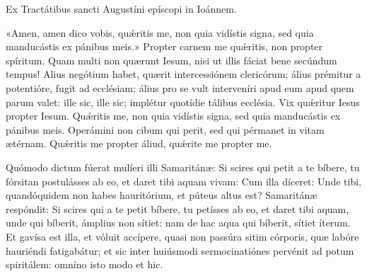 {

\noindent Ex Tractátibus sancti Augustíni epíscopi in Ioánnem.

\noindent «Amen, amen dico vobis, quǽritis me, non quia vidístis signa, sed quia manducástis ex pánibus meis.» Propter carnem me quǽritis, non propter spíritum. Quam multi non quærunt Iesum, nisi ut illis fáciat bene secúndum tempus! Alius negótium habet, quærit intercessiónem clericórum; álius prémitur a potentióre, fugit ad ecclésiam; álius pro se vult interveníri apud eum apud quem parum valet: ille sic, ille sic; implétur quotídie tálibus ecclésia. Vix quǽritur Iesus propter Iesum. Quǽritis me, non quia vidístis signa, sed quia manducástis ex pánibus meis. Operámini non cibum qui perit, sed qui pérmanet in vitam ætérnam. Quǽritis me propter áliud, quǽrite me propter me. 

\noindent Quómodo dictum fúerat mulíeri illi Samaritánæ: Si scires qui petit a te bíbere, tu fórsitan postulásses ab eo, et daret tibi aquam vivam: Cum illa díceret: Unde tibi, quandóquidem non habes hauritórium, et púteus altus est? Samaritánæ respóndit: Si scires qui a te petit bíbere, tu petísses ab eo, et daret tibi aquam, unde qui bíberit, ámplius non sítiet: nam de hac aqua qui bíberit, sítiet íterum. Et gavísa est illa, et vóluit accípere, quasi non passúra sitim córporis, quæ labóre hauriéndi fatigabátur; et sic inter huiúsmodi sermocinatiónes pervénit ad potum spiritálem: omníno isto modo et hic.

\vfill
\pagebreak

 

\vspace{-5mm}


\vfill
\pagebreak
}
\newcommand{\benedictus}{\pars{Canticum Zachariæ.} \scriptura{Io. 6, 27}

\vspace{-4mm}

\antiphona{VIII G}{temporalia/ant-operamininoncibum.gtex}

\vspace{-2mm}

\scriptura{Lc. 1, 68-79}

\vspace{-2mm}

\cantusSineNeumas
\initiumpsalmi{temporalia/benedictus-initium-viiisoll-G-auto.gtex}


 \Abardot{}}


